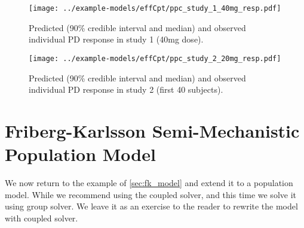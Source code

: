 \documentclass[12pt, reqno, oneside]{amsbook}
\numberwithin{equation}{chapter}
\numberwithin{figure}{chapter}
\numberwithin{table}{chapter}
\theoremstyle{remark}
\begin{document}
\begin{figure}[htbp]
\centering
\texttt{[image: ../example-models/effCpt/ppc\_study\_1\_40mg\_resp.pdf]}
\caption{\label{effcpt_ppc_resp_40mg}Predicted (90\% credible interval and median) and observed individual PD response in study 1 (40mg dose).}
\end{figure}

\begin{figure}[htbp]
\centering
\texttt{[image: ../example-models/effCpt/ppc\_study\_2\_20mg\_resp.pdf]}
\caption{\label{effcpt_ppc_resp_study_2_20mg}Predicted (90\% credible interval and median) and observed individual PD response in study 2 (first 40 subjects).}
\end{figure}

\section{Friberg-Karlsson Semi-Mechanistic Population Model}
\label{sec:org830b60b}
We now return to the example of \ref{sec:fk_model} and extend
it to a population model. While we recommend using the coupled
solver, and this time we solve it using group solver. We leave it
as an exercise to the reader to rewrite the model with
coupled solver.
\end{document}
